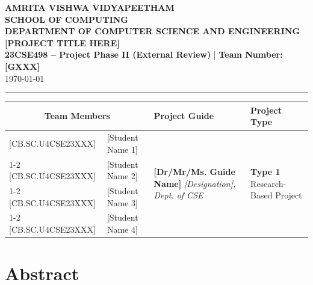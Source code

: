 \documentclass[11pt, a4paper]{article}
\begin{document}
\noindent
\begin{minipage}{\textwidth}
    \centering
    {\Large \textbf{\textcolor{amritaMaroon}{
    AMRITA VISHWA VIDYAPEETHAM \\
    SCHOOL OF COMPUTING \\
    DEPARTMENT OF COMPUTER SCIENCE AND ENGINEERING \\
    }}}
    \vspace{0.2cm}
    {\large \textbf{[PROJECT TITLE HERE]}} \\[0.1cm]
    \textbf{23CSE498 -- Project Phase II (External Review)} \quad | \quad \textbf{Team Number: [GXXX]} \\
    \today
\end{minipage}

\vspace{0.3cm}
\hrule
\vspace{0.3cm}

\noindent
\begin{center}
    \renewcommand{\arraystretch}{1.45}
    \setlength{\tabcolsep}{6pt}
    \begin{tabular}{|l|p{4.8cm}|p{4.6cm}|p{3.2cm}|}
        \hline
        \multicolumn{2}{|c|}{\textbf{Team Members}} & \textbf{Project Guide} & \textbf{Project Type} \\
        \hline
        \small [CB.SC.U4CSE23XXX] & \small \raggedright [Student Name 1] &
        \multirow{4}{=}{\raggedright \small \textbf{[Dr/Mr/Ms. Guide Name]} \newline \textit{[Designation], \newline Dept. of CSE}} &
        \multirow{4}{=}{\raggedright \small \textbf{Type 1} \newline Research-Based Project} \\ \cline{1-2}
        \small [CB.SC.U4CSE23XXX] & \small [Student Name 2] & & \\ \cline{1-2}
        \small [CB.SC.U4CSE23XXX] & \small [Student Name 3] & & \\ \cline{1-2}
        \small [CB.SC.U4CSE23XXX] & \small [Student Name 4] & & \\
        \hline
    \end{tabular}
\end{center}
\vspace{0.2cm}

\section{Abstract}
\end{document}
